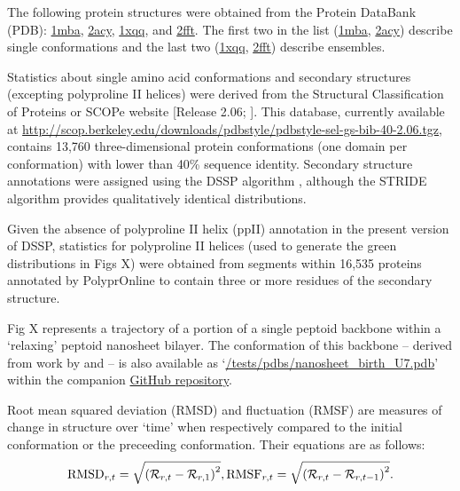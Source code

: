 \documentclass[fleqn,10pt,lineno]{wlpeerj} %
\begin{document}
The following protein structures were obtained from the Protein DataBank (PDB): \href{https://www.rcsb.org/structure/1MBA}{1mba}, \href{https://www.rcsb.org/structure/2ACY}{2acy}, \href{https://www.rcsb.org/structure/1XQQ}{1xqq}, and \href{https://www.rcsb.org/structure/2FFT}{2fft}. The first two in the list (\href{https://www.rcsb.org/structure/1MBA}{1mba}, \href{https://www.rcsb.org/structure/2ACY}{2acy}) describe single conformations and the last two (\href{https://www.rcsb.org/structure/1XQQ}{1xqq}, \href{https://www.rcsb.org/structure/2FFT}{2fft}) describe ensembles.

Statistics about single amino acid conformations and secondary structures (excepting polyproline II helices) were derived from the Structural Classification of Proteins or SCOPe website [Release 2.06; \cite{Fox2014}]. This database, currently available at  \url{http://scop.berkeley.edu/downloads/pdbstyle/pdbstyle-sel-gs-bib-40-2.06.tgz}, contains 13,760 three-dimensional protein conformations (one domain per conformation) with lower than 40\% sequence identity. Secondary structure annotations were assigned using the DSSP algorithm \citep{Kabsch1983}, although the STRIDE algorithm \citep{Frishman1995} provides qualitatively identical distributions. 

Given the absence of polyproline II helix (ppII) annotation in the 
present version of DSSP, statistics for polyproline II helices (used to 
generate the green distributions in Figs X) were obtained from segments 
within 16,535 proteins annotated by PolyprOnline \citep{Chebrek2014} to contain three or more residues of the secondary structure.

Fig X represents a trajectory of a portion of a single peptoid backbone 
within a `relaxing' peptoid nanosheet bilayer. The conformation of this 
backbone -- derived from work by \cite{Mannige2015} and 
\cite{Mannige2016} -- is also available as `\href{https://github.com/ranjanmannige/backmap/blob/master/tests/pdbs/nanosheet_birth_U7.pdb}{/tests/pdbs/nanosheet\_birth\_U7.pdb}' within the companion \href{https://github.com/ranjanmannige/backmap/}{GitHub repository}.

Root mean squared deviation (RMSD) and fluctuation (RMSF) are measures of change in structure over `time' when respectively compared to the initial conformation or the preceeding conformation. Their equations are as follows:
\begin{equation}
\textrm{RMSD}_{r,t} = \displaystyle  \sqrt{\left(\mathcal{R}_{r,t}-\mathcal{R}_{r,1  }\right)^2}, \\
\textrm{RMSF}_{r,t} = \displaystyle  \sqrt{\left(\mathcal{R}_{r,t}-\mathcal{R}_{r,t-1}\right)^2}.
\end{equation}
\end{document}
